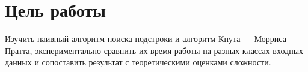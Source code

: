 \section{Цель работы}
Изучить наивный алгоритм поиска подстроки и алгоритм Кнута — Морриса — Пратта,
экспериментально сравнить их время работы на разных классах входных данных и сопоставить
результат с теоретическими оценками сложности.
